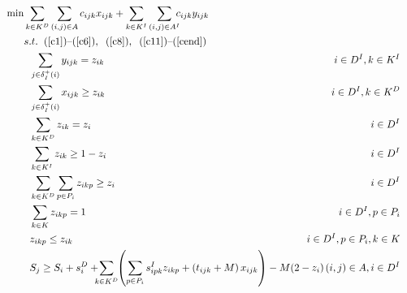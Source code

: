 \documentclass{article}
\begin{document}
{\iffalse
\begin{align}
    \label{model:obj2} \min  &  \sum_{k \in K^{D}}\sum_{(i,j) \in A} c_{ijk}x_{ijk} + \sum_{k \in K^{I}}\sum_{(i,j) \in A^I} \hspace{-2mm}c_{ijk}y_{ijk}  &\\
    \label{mod1:c1} & s.t. \hspace{2mm} (\ref{c1})\text{--}(\ref{c6}), \hspace{2mm} (\ref{c8}), \hspace{2mm} (\ref{c11})\text{--}(\ref{cend}) & \\
    \label{c47} & \hspace{2mm}  \sum_{j \in \delta^{+}_I(i)}y_{ijk} = z_{ik} & \hspace{-40mm}  i \in {D^I},k \in K^{I} \hspace{5mm} \\
    \label{c470}  & \hspace{2mm} \sum_{j \in \delta^{+}_I(i)}x_{ijk} \geq z_{ik} & \hspace{-40mm}  i \in D^I,k \in K^D \hspace{5mm} \\
    \label{c471} & \hspace{2mm} \sum_{k \in K^D} z_{ik} = z_i & \hspace{-40mm}  i \in {D^I} \hspace{5mm} \\
    \label{c48} & \hspace{2mm} \sum_{k \in K^I} z_{ik} \geq 1-z_i & \hspace{-40mm} i \in {D^I} \hspace{5mm} \\
    \label{c49} & \hspace{2mm} \sum_{k \in K^D}\sum_{p \in P_i} z_{ikp} \geq z_i & \hspace{-40mm} i \in {D^I} \hspace{5mm} \\
    \label{c50}& \hspace{2mm} \sum_{k \in K} z_{ikp} = 1 & \hspace{-40mm} i \in {D^I}, p \in P_i \hspace{5mm} \\
    \label{c51} & \hspace{2mm} z_{ikp} \leq z_{ik} & \hspace{-40mm} i \in {D^I}, p \in P_i, k \in K \hspace{5mm} \\
    \label{c53} & \hspace{2mm}  S_j \hspace{-0mm} \geq S_i + s^D_i + \hspace{-2mm} \sum_{k \in K^D} \hspace{-1mm} \left( \sum_{p \in P_i}s_{ipk}^Iz_{ikp} +\left( t_{ijk} + M \right) x_{ijk} \right) - M(2-z_i)   & \hspace{-3mm} (i,j) \in {A}, i \in D^I \hspace{5mm} \\

\end{align}}
\end{document}
